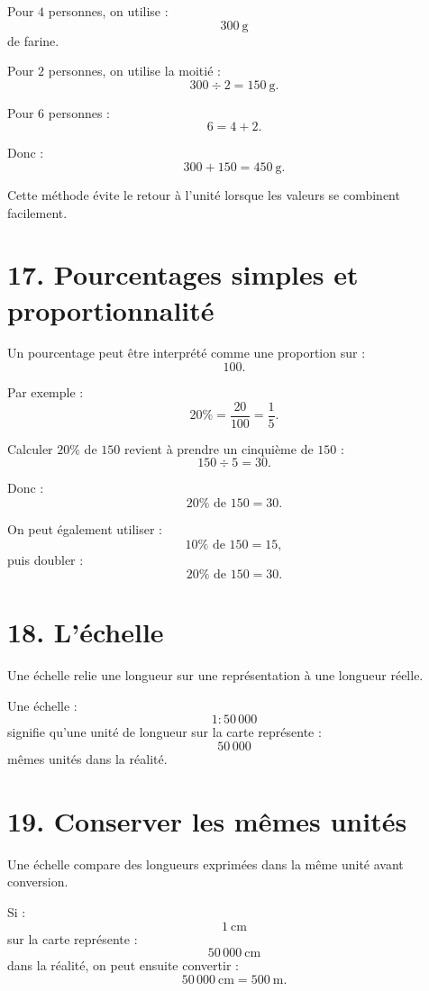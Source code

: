 Pour $4$ personnes, on utilise :
\[
300\ \text{g}
\]
de farine.

Pour $2$ personnes, on utilise la moitié :
\[
300\div2=150\ \text{g}.
\]

Pour $6$ personnes :
\[
6=4+2.
\]

Donc :
\[
300+150=450\ \text{g}.
\]

Cette méthode évite le retour à l'unité lorsque les valeurs se combinent facilement.

\section{17. Pourcentages simples et proportionnalité}

Un pourcentage peut être interprété comme une proportion sur :
\[
100.
\]

Par exemple :
\[
20\%=\dfrac{20}{100}=\dfrac15.
\]

Calculer $20\%$ de $150$ revient à prendre un cinquième de $150$ :
\[
150\div5=30.
\]

Donc :
\[
\boxed{20\%\text{ de }150=30}.
\]

On peut également utiliser :
\[
10\%\text{ de }150=15,
\]
puis doubler :
\[
20\%\text{ de }150=30.
\]

\section{18. L'échelle}

Une échelle relie une longueur sur une représentation à une longueur réelle.


Une échelle :
\[
1:50\,000
\]
signifie qu'une unité de longueur sur la carte représente :
\[
50\,000
\]
mêmes unités dans la réalité.

\section{19. Conserver les mêmes unités}

Une échelle compare des longueurs exprimées dans la même unité avant conversion.

Si :
\[
1\ \text{cm}
\]
sur la carte représente :
\[
50\,000\ \text{cm}
\]
dans la réalité, on peut ensuite convertir :
\[
50\,000\ \text{cm}=500\ \text{m}.
\]

